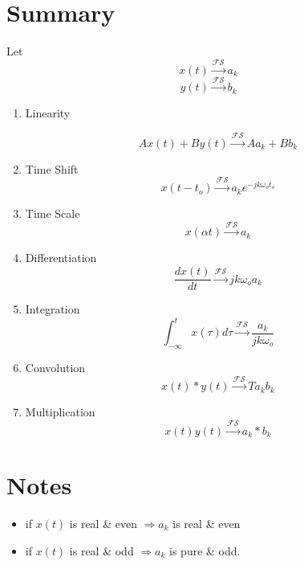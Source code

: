 \documentclass[11pt,a4paper]{article}
\theoremstyle{definition}
\begin{document}
\section{Summary}
Let 
\[
    x(t) \xrightarrow{\mathcal{F}\mathcal{S}} a_k
\]
\[
    y(t) \xrightarrow{\mathcal{F}\mathcal{S}} b_k
\]
\begin{enumerate}
    \item Linearity

        \[
            Ax(t) + By(t) \xrightarrow{\mathcal{F}\mathcal{S}} Aa_k + Bb_k
        \]
    \item Time Shift
\[
    x(t-t_o) \xrightarrow{\mathcal{F}\mathcal{S}} a_k e^{-jk\omega_ot_o}
\]
\item Time Scale
\[
    x(\alpha t) \xrightarrow{\mathcal{F}\mathcal{S}} a_k 
\]
\item Differentiation
\[
    \dfrac{dx(t)}{dt} \xrightarrow{\mathcal{F}\mathcal{S}} jk\omega_o a_k
\]
\item Integration
    \[
        \int_{-\infty}^t x(\tau)d\tau \xrightarrow{\mathcal{F}\mathcal{S}} 
        \frac{a_k}{jk\omega_o}
    \]
\item Convolution 
    \[
        x(t)*y(t) \xrightarrow{\mathcal{F}\mathcal{S}} Ta_kb_k
    \]
\item Multiplication
    \[
        x(t)y(t) \xrightarrow{\mathcal{F}\mathcal{S}} a_k*b_k
    \]
\end{enumerate}
\section{Notes}
\begin{itemize}
    \item if $x(t)$ is real \& even $\Rightarrow a_k$ is real \& even   
    \item if $x(t)$ is real \& odd $\Rightarrow a_k$ is pure \& odd.
\end{itemize}
\end{document}
